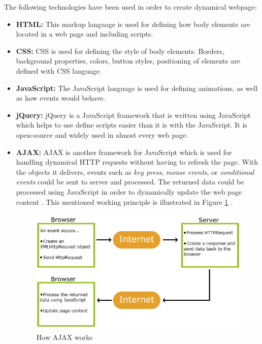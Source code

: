 The following technologies have been used in order to create dynamical webpage:
\begin{itemize}
	\item \textbf{HTML:} This markup language is used for defining how body elements are located in a web page and including scripts.
	\item \textbf{CSS:} CSS is used for defining the style of body elements. Borders, background properties, colors, button styles, positioning of elements are defined with CSS language.
	\item \textbf{JavaScript:} The JavaScript language is used for defining animations, as well as how events would behave.
	\item \textbf{jQuery:} jQuery \cite{jquery} is a JavaScript framework that is written using JavaScript which helps to use define scripts easier than it is with the JavaScript. It is open-source and widely used in almost every web page.
	\item \textbf{AJAX:} AJAX \cite{howajaxworks} is another framework for JavaScript which is used for handling dynamical HTTP requests without having to refresh the page. With the objects it delivers, events such as \textit{key press}, \textit{mouse events}, or \textit{conditional events} could be sent to server and processed. The returned data could be processed using JavaScript in order to dynamically update the web page content \cite{howajaxworks}. This mentioned working principle is illustrated in Figure \ref{fig:ajaxpng} \cite{howajaxworks}. 
	\begin{figure}[!ht]
		\centering
		\captionsetup{justification=centering}
		\includegraphics[scale=0.7]{content/images/ajax.png}
		\caption{How AJAX works \cite{howajaxworks}}
		\label{fig:ajaxpng}
	\end{figure}
\end{itemize}

